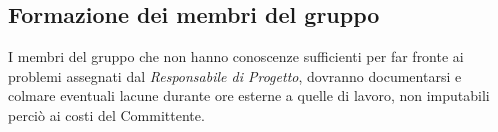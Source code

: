 \subsection{Formazione dei membri del gruppo}
I membri del gruppo che non hanno conoscenze sufficienti per far fronte ai problemi assegnati dal \textit{Responsabile di Progetto}, dovranno
documentarsi e colmare eventuali lacune durante ore esterne a quelle di lavoro, non imputabili perciò ai costi del Committente.

